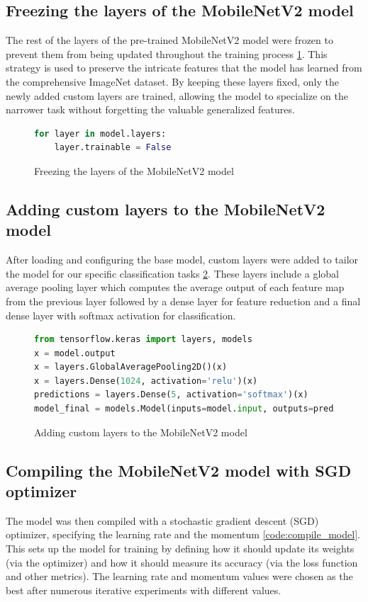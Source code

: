 \subsection{Freezing the layers of the MobileNetV2 model}
The rest of the layers of the pre-trained MobileNetV2 model were frozen to prevent them from being updated throughout the training process \ref{code:freeze_layers}. This strategy is used to preserve the intricate features that the model has learned from the comprehensive ImageNet dataset. By keeping these layers fixed, only the newly added custom layers are trained, allowing the model to specialize on the narrower task without forgetting the valuable generalized features.

\begin{figure}[H]
\begin{lstlisting}[language=Python]
for layer in model.layers:
    layer.trainable = False
\end{lstlisting}
\caption{Freezing the layers of the MobileNetV2 model}
\label{code:freeze_layers}
\end{figure}

\subsection{Adding custom layers to the MobileNetV2 model}
After loading and configuring the base model, custom layers were added to tailor the model for our specific classification tasks \ref{code:custom_layers}. These layers include a global average pooling layer which computes the average output of each feature map from the previous layer followed by a dense layer for feature reduction and a final dense layer with softmax activation for classification.

\begin{figure}[H]
\begin{lstlisting}[language=Python]
from tensorflow.keras import layers, models
x = model.output
x = layers.GlobalAveragePooling2D()(x)
x = layers.Dense(1024, activation='relu')(x)
predictions = layers.Dense(5, activation='softmax')(x)
model_final = models.Model(inputs=model.input, outputs=predictions)
\end{lstlisting}
\caption{Adding custom layers to the MobileNetV2 model}
\label{code:custom_layers}
\end{figure}

\subsection{Compiling the MobileNetV2 model with SGD optimizer}
The model was then compiled with a stochastic gradient descent (SGD) optimizer, specifying the learning rate and the momentum \ref{code:compile_model}. This sets up the model for training by defining how it should update its weights (via the optimizer) and how it should measure its accuracy (via the loss function and other metrics). The learning rate and momentum values were chosen as the best after numerous iterative experiments with different values.

